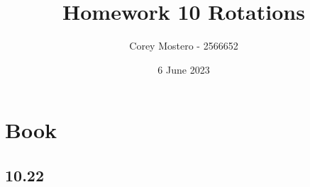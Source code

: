 \documentclass{article}
\title{Homework 10 Rotations}
\author{Corey Mostero - 2566652}
\date{6 June 2023}
\begin{document}
\newcommand{\hr}{\par\noindent\rule{\textwidth}{0.4pt}}

\newcommand{\bc}[1]{
	\begin{equation*}
		\begin{boxed}
			{#1}
		\end{boxed}
	\end{equation*}
}

\newcommand{\cond}[2]{
	\ifmmode
		{#1} \quad {#2}
	\else
		$$ {#1} \quad {#2} $$
	\fi
}

\newcommand{\matr}[1]{
	\ifmmode \bm{#1}
	\else \textit{\textbf{#1}}
	\fi
}
\newcommand{\vect}[1]{
	\ifmmode \mathbf{#1}
	\else \textbf{#1}
	\fi
}


\newcommand{\boldalpha}{\textbf{(\alph*)}}

\maketitle
\newpage

\tableofcontents

\section{Book}

\subsection{10.22}
\end{document}
